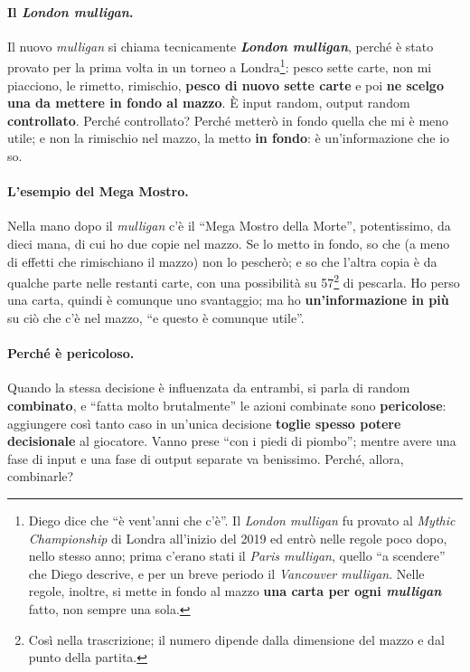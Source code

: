 \paragraph{Il \emph{London mulligan}.} Il nuovo \emph{mulligan} si chiama tecnicamente
\textbf{\emph{London mulligan}}, perché è stato provato per la prima volta in un torneo a
Londra\footnote{Diego dice che ``è vent'anni che c'è''. Il \emph{London mulligan} fu provato
al \emph{Mythic Championship} di Londra all'inizio del 2019 ed entrò nelle regole poco dopo,
nello stesso anno; prima c'erano stati il \emph{Paris mulligan}, quello ``a scendere'' che
Diego descrive, e per un breve periodo il \emph{Vancouver mulligan}. Nelle regole, inoltre, si
mette in fondo al mazzo \textbf{una carta per ogni \emph{mulligan}} fatto, non sempre una
sola.}: pesco sette carte, non mi piacciono, le rimetto, rimischio, \textbf{pesco di nuovo
sette carte} e poi \textbf{ne scelgo una da mettere in fondo al mazzo}. È input random, output
random \textbf{controllato}. Perché controllato? Perché metterò in fondo quella che mi è meno
utile; e non la rimischio nel mazzo, la metto \textbf{in fondo}: è un'informazione che io so.

\paragraph{L'esempio del Mega Mostro.} Nella mano dopo il \emph{mulligan} c'è il ``Mega Mostro
della Morte'', potentissimo, da dieci mana, di cui ho due copie nel mazzo. Se lo metto in
fondo, so che (a meno di effetti che rimischiano il mazzo) non lo pescherò; e so che l'altra
copia è da qualche parte nelle restanti carte, con una possibilità su 57\footnote{Così nella
trascrizione; il numero dipende dalla dimensione del mazzo e dal punto della partita.} di
pescarla. Ho perso una carta, quindi è comunque uno svantaggio; ma ho \textbf{un'informazione
in più} su ciò che c'è nel mazzo, ``e questo è comunque utile''.

\paragraph{Perché è pericoloso.} Quando la stessa decisione è influenzata da entrambi, si
parla di random \textbf{combinato}, e ``fatta molto brutalmente'' le azioni combinate sono
\textbf{pericolose}: aggiungere così tanto caso in un'unica decisione \textbf{toglie spesso
potere decisionale} al giocatore. Vanno prese ``con i piedi di piombo''; mentre avere una fase
di input e una fase di output separate va benissimo. Perché, allora, combinarle?

